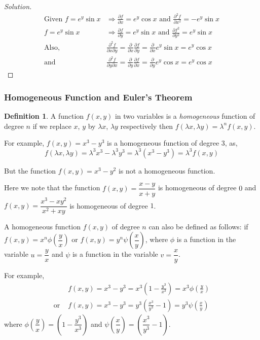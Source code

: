 \documentclass[../../main.tex]{subfiles}
\theoremstyle{definition}
\newtheorem{definition}{Definition}[section]
\newenvironment{solution}
    {\begin{proof}[Solution]}
    {\end{proof}}
\begin{document}
\begin{solution}
    \begin{align*}
        \text{Given } f = e^y\sin x &\Rightarrow \frac{\partial f}{\partial x}=e^y\cos x \text { and } \frac{\partial^2f}{\partial x^2}=-e^y\sin x \\
        f = e^y\sin x &\Rightarrow \frac{\partial f}{\partial y}=e^y\sin x \text { and } \frac{\partial f^2}{\partial y^2}=e^y\sin x \\
     \text{Also, } & \frac{\partial^2f}{\partial x\partial y}=\frac{\partial }{\partial x}\frac{\partial f}{\partial y}=\frac{\partial }{\partial x}e^y\sin x=e^y\cos x \\ 
        \text{and } & \frac{\partial^2f}{\partial y\partial x}=\frac{\partial }{\partial y}\frac{\partial f}{\partial x}=\frac{\partial }{\partial y}e^y\cos x=e^y\cos x
    \end{align*}
    
\end{solution}

\subsubsection{Homogeneous Function and Euler's Theorem}

\begin{definition}
A function $f(x,y)$ in two variables is a \emph{homogeneous} function of degree $n$ if we replace $x$, $y$ by $\lambda x$, $\lambda y$ respectively then $f(\lambda x, \lambda y)=\lambda^nf(x,y)$.    
\end{definition}

For example, $f(x,y)=x^3-y^3$ is a homogeneous function of degree 3, as,
\[
f(\lambda x, \lambda y)=\lambda^3x^3-\lambda^3y^3=\lambda^3(x^3-y^3)=\lambda^3f(x,y)
\]

But the function $f(x,y)=x^3-y^2$ is not a homogeneous function.

Here we note that the function $f(x,y)=\dfrac{x-y}{x+y}$ is homogeneous of degree $0$ and $f(x,y)=\dfrac{x^3-xy^2}{x^2+xy}$ is homogeneous of degree $1$.

A homogeneous function $f(x,y)$ of degree $n$ can also be defined as follows: if $f(x,y)=x^n\phi(\dfrac{y}{x})$ or $f(x,y)=y^n\psi(\dfrac{x}{y})$, where $\phi$ is a function in the variable $u=\dfrac{y}{x}$ and $\psi$ is a function in the variable $v=\dfrac{x}{y}$.

For example,
\begin{align*}
    & f(x,y)=x^3-y^3=x^3(1-\frac{y^3}{x^3})=x^3\phi(\frac{y}{x}) \\
    \text{or } &f(x,y)=x^3-y^3=y^3(\frac{x^3}{y^3}-1)=y^3\psi(\frac{x}{y})
\end{align*}
where $\phi (\dfrac{y}{x})=(1-\dfrac{y^3}{x^3})$ and $\psi(\dfrac{x}{y})=(\dfrac{x^3}{y^3}-1)$.
\end{document}
